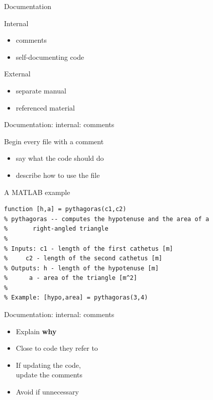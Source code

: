 \documentclass[10pt]{beamer}
\begin{document}
\begin{frame}[t]{Documentation} %

	\LARGE
	\begin{block}{Internal}
		\begin{itemize}
		      \item comments
		      \item self-documenting code
		\end{itemize}
	\end{block}
	\begin{block}{External}
		\begin{itemize}
		      \item separate manual
		      \item referenced material
		\end{itemize}
	\end{block}


\end{frame}

\begin{frame}[t,fragile]{Documentation: internal: comments} %

	\begin{block}{Begin every file with a comment}
		\begin{itemize}
		      \item say what the code should do
		      \item describe how to use the file
		\end{itemize}
	\end{block}

	\begin{block}{A MATLAB example}
\begin{verbatim}
function [h,a] = pythagoras(c1,c2)
% pythagoras -- computes the hypotenuse and the area of a
%		right-angled triangle
%
% Inputs: c1 - length of the first cathetus [m]
%	  c2 - length of the second cathetus [m]
% Outputs: h - length of the hypotenuse [m]
%	   a - area of the triangle [m^2]
%
% Example: [hypo,area] = pythagoras(3,4)
\end{verbatim}
	\end{block}

\end{frame}

\begin{frame}[t]{Documentation: internal: comments} %
	\Huge
	\begin{itemize}
		\item Explain \textbf{why}
		\item Close to code they refer to
		\item If updating the code, \\ update the comments
		\item Avoid if unnecessary
	\end{itemize}

\end{frame}
\end{document}
